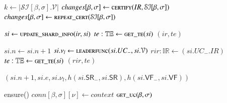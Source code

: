\begin{algorithm}
\begin{algorithmic}[0]
      \State    {}
      \State $k \gets  |\mathcal{SI}[\beta, \sigma].\mathcal{V}|$ 
                  
        \State $changes[\beta, \sigma] \gets \Call{certify}{IR, \mathcal{SI}[\beta, \sigma]}$
       
        \State     {}
        \State $changes[\beta, \sigma] \gets \Call{repeat\_cert}{\mathcal{SI}[\beta, \sigma]}$    
      \EndIf
    \EndMessage
  \end{algorithmic}
\end{algorithm}

\begin{algorithm}
  \caption{Certification helper functions}\label{alg:cert-helpers}
  \begin{algorithmic}[0]
      \State $si \gets \Call{update\_shard\_info}{ir, si}$
      \State {}
      \State $te: \mathbb{TE} \gets \Call{get\_te}{si}$
      \State \Return $(ir, te)$
    \EndFunction

      \State $si.n \gets si.n+1$  
      \State $si.\nu_l \gets \Call{leaderfunc}{si.UC_-, si.\mathcal{V}}$
      \State $rir: \mathbb{IR} \gets (si.UC_-.IR)$  
      \State $te: \mathbb{TE} \gets \Call{get\_te}{si}$
      \State \Return $(rir, te)$
    \EndFunction

      \State \Return $(si.n+1, si.e, si.\nu_l, h(si.\mathsf{SR}_-, si.\mathsf{SR}), h(si.\mathsf{VF}_-, si.\mathsf{VF}))$
    \EndFunction
  \end{algorithmic}
\end{algorithm}

\begin{algorithm}
  \caption{``SubscriptionMsg'' subscribes to UC feed}\label{alg:ping}
  \begin{algorithmic}[0]
      \State ensure()
      \State $conn[\beta, \sigma][\nu] \gets context$         
      \State \Return $\Call{get\_uc}{\beta, \sigma}$
    \EndMessage
  \end{algorithmic}
\end{algorithm}

